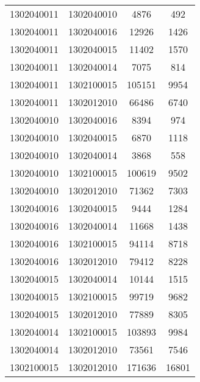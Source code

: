 \begin{longtable}[h]{llcc}
		1302040011 & 1302040010 & 4876 & 492\\
		1302040011 & 1302040016 & 12926 & 1426\\
		1302040011 & 1302040015 & 11402 & 1570\\
		1302040011 & 1302040014 & 7075 & 814\\
		1302040011 & 1302100015 & 105151 & 9954\\
		1302040011 & 1302012010 & 66486 & 6740\\
		1302040010 & 1302040016 & 8394 & 974\\
		1302040010 & 1302040015 & 6870 & 1118\\
		1302040010 & 1302040014 & 3868 & 558\\
		1302040010 & 1302100015 & 100619 & 9502\\
		1302040010 & 1302012010 & 71362 & 7303\\
		1302040016 & 1302040015 & 9444 & 1284\\
		1302040016 & 1302040014 & 11668 & 1438\\
		1302040016 & 1302100015 & 94114 & 8718\\
		1302040016 & 1302012010 & 79412 & 8228\\
		1302040015 & 1302040014 & 10144 & 1515\\
		1302040015 & 1302100015 & 99719 & 9682\\
		1302040015 & 1302012010 & 77889 & 8305\\
		1302040014 & 1302100015 & 103893 & 9984\\
		1302040014 & 1302012010 & 73561 & 7546\\
		1302100015 & 1302012010 & 171636 & 16801\\
\end{longtable}